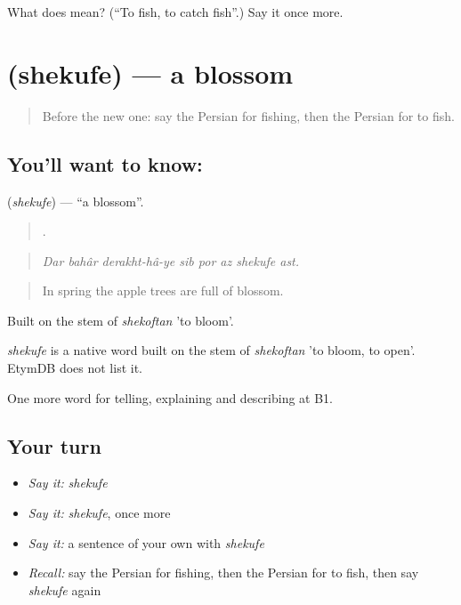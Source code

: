 \begin{tcolorbox}[breakable,colback=teal!4,colframe=teal!35!black,title={Before you move on}]
What does   mean? (\textquotedblleft{}To fish, to catch fish\textquotedblright{}.) Say it once more.
\end{tcolorbox}
\section[\texorpdfstring{\fa{شکوفه} (shekufe)}{شکوفه (shekufe)}]{ (shekufe) — a blossom}

\label{lesson:FA-C471-shekufe}



\begin{quote}
Before the new one: say the Persian for fishing, then the Persian for to fish.
\end{quote}

\subsection*{You'll want to know: }
\textbf{} (\emph{shekufe}) — \textquotedblleft{}a blossom\textquotedblright{}.

\begin{quote}
       .
\end{quote}

\begin{quote}
\emph{Dar bahâr derakht-hâ-ye sib por az shekufe ast.}
\end{quote}

\begin{quote}
In spring the apple trees are full of blossom.
\end{quote}

Built on the stem of \emph{shekoftan} 'to bloom'.

\begin{cousinweb}
\emph{shekufe} is a native word built on the stem of \emph{shekoftan} 'to bloom, to open'. EtymDB does not list it.
\end{cousinweb}

\begin{grammarlens}[title={What you've built}]
One more word for telling, explaining and describing at B1.
\end{grammarlens}

\subsection*{Your turn}
\begin{itemize}
\raggedright
  \item \emph{Say it:} \emph{shekufe}
  \item \emph{Say it:} \emph{shekufe}, once more
  \item \emph{Say it:} a sentence of your own with \emph{shekufe}
  \item \emph{Recall:} say the Persian for fishing, then the Persian for to fish, then say \emph{shekufe} again
\end{itemize}

